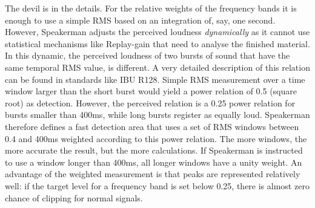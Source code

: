 \documentclass[11pt]{article}
\begin{document}
The devil is in the details.
For the relative weights of the frequency bands it is enough to use a simple RMS based on an integration of, say, one second.
However, Speakerman adjusts the perceived loudness \emph{dynamically} as it cannot use statistical mechanisms like Replay-gain that need to analyse the finished material.
In this dynamic, the perceived loudness of two bursts of sound that have the same temporal RMS value, is different.
A very detailed description of this relation can be found in standards like IBU R128.
Simple RMS measurement over a time window larger than the short burst would yield a power relation of 0.5 (square root) as detection.
However, the perceived relation is a 0.25 power relation for bursts smaller than 400ms, while long bursts register as equally loud.
Speakerman therefore defines a fast detection area that uses a set of RMS windows between 0.4 and 400ms weighted according to this power relation.
The more windows, the more accurate the result, but the more calculations.
If Speakerman is instructed to use a window longer than 400ms, all longer windows have a unity weight.
An advantage of the weighted measurement is that peaks are represented relatively well: if the target level for a frequency band is set below 0.25, there is almost zero chance of clipping for normal signals.
\end{document}
